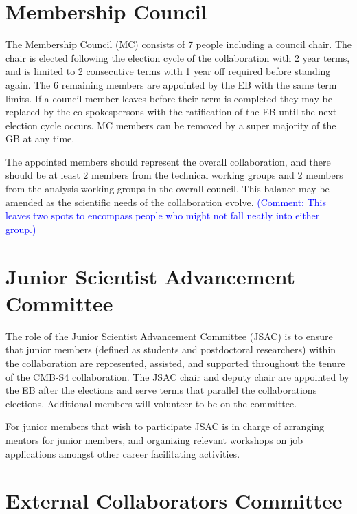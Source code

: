 \documentclass[12pt]{article}
\newcommand{\Comment}[1]{\textcolor{Blue}{(Comment: #1)}}
\begin{document}

\section{Membership Council}

The Membership Council (MC) consists of 7 people including a council chair. The chair is elected following the election cycle of the collaboration with  2 year terms, and is limited to 2 consecutive terms with 1 year off required before standing again. The 6 remaining members are appointed by the EB with the same term limits. If a council member leaves before their term is completed they may be replaced by the co-spokespersons with the ratification of the EB until the next election cycle occurs. MC members can be removed by a super majority of the GB at any time.  


The appointed members should represent the overall collaboration, and there should be at least 2 members from the technical working groups and 2 members from the analysis working groups in the overall council. This balance may be amended as the scientific needs of the collaboration evolve. \Comment{This leaves two spots to encompass people who might not fall neatly into either group.}





\section{Junior Scientist Advancement Committee}

The role of the Junior Scientist Advancement Committee (JSAC) is to ensure that junior members (defined as students and postdoctoral researchers) within the collaboration are represented, assisted, and supported throughout the  tenure of the CMB-S4 collaboration. The JSAC chair and deputy chair are appointed by the EB after the elections and serve terms that parallel the collaborations elections. Additional members will volunteer to be on the committee.

For junior members that wish to participate JSAC is in charge of arranging mentors for junior members, and organizing relevant workshops on job applications amongst other career facilitating activities.  

\section{External Collaborators Committee}
\end{document}
